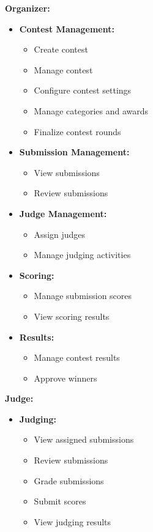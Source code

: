 \textbf{Organizer:}
\begin{itemize}[leftmargin=1.5em, nosep]
    \item \textbf{Contest Management:}
    \begin{itemize}[leftmargin=1.5em, nosep]
        \item Create contest
        \item Manage contest
        \item Configure contest settings
        \item Manage categories and awards
        \item Finalize contest rounds
    \end{itemize}
    \item \textbf{Submission Management:}
    \begin{itemize}[leftmargin=1.5em, nosep]
        \item View submissions
        \item Review submissions
    \end{itemize}
    \item \textbf{Judge Management:}
    \begin{itemize}[leftmargin=1.5em, nosep]
        \item Assign judges
        \item Manage judging activities
    \end{itemize}
    \item \textbf{Scoring:}
    \begin{itemize}[leftmargin=1.5em, nosep]
        \item Manage submission scores
        \item View scoring results
    \end{itemize}
    \item \textbf{Results:}
    \begin{itemize}[leftmargin=1.5em, nosep]
        \item Manage contest results
        \item Approve winners
    \end{itemize}
\end{itemize}

\textbf{Judge:}
\begin{itemize}[leftmargin=1.5em, nosep]
    \item \textbf{Judging:}
    \begin{itemize}[leftmargin=1.5em, nosep]
        \item View assigned submissions
        \item Review submissions
        \item Grade submissions
        \item Submit scores
        \item View judging results
    \end{itemize}
\end{itemize}


